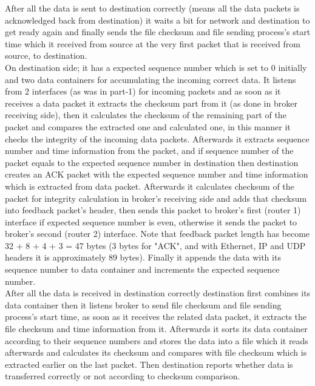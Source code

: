 \documentclass[conference]{IEEEtran}
\begin{document}
After all the data is sent to destination correctly (means all the data packets is acknowledged back from destination) it waits a bit for network and destination to get ready again and finally sends the file checksum and file sending process's start time which it received from source at the very first packet that is received from source, to destination. \\

On destination side; it has a expected sequence number which is set to 0 initially and  two data containers for accumulating the incoming correct data. It listens from 2 interfaces (as was in part-1) for incoming packets and as soon as it receives a data packet it extracts the checksum part from it (as done in broker receiving side), then it calculates the checksum of the remaining part of the packet and compares the extracted one and calculated one, in this manner it checks the integrity of the incoming data packets. Afterwards it extracts sequence number and time information from the packet, and if sequence number of the packet equals to the expected sequence number in destination then destination creates an ACK packet with the expected sequence number and time information which is extracted from data packet. Afterwards it calculates checksum of the packet for integrity calculation in broker's receiving side and adds that checksum into feedback packet's header, then sends this packet to broker's first (router 1) interface if expected sequence number is even, otherwise it sends the packet to broker's second (router 2) interface. Note that feedback packet length has become 32 + 8 + 4 + 3 = 47 bytes (3 bytes for "ACK", and with Ethernet, IP and UDP headers it is approximately 89 bytes). Finally it appends the data with its sequence number to data container and increments the expected sequence number. \\

After all the data is received in destination correctly destination first combines its data container then it listens broker to send file checksum and file sending process's start time, as soon as it receives the related data packet, it extracts the file checksum and time information from it. Afterwards it sorts its data container according to their sequence numbers and stores the data into a file which it reads afterwards and calculates its checksum and compares with file checksum which is extracted earlier on the last packet. Then destination reports whether data is transferred correctly or not according to checksum comparison. \\
\end{document}
